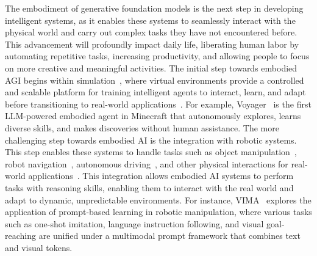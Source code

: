 The embodiment of generative foundation models is the next step in developing intelligent systems, as it enables these systems to seamlessly interact with the physical world and carry out complex tasks they have not encountered before. This advancement will profoundly impact daily life, liberating human labor by automating repetitive tasks, increasing productivity, and allowing people to focus on more creative and meaningful activities. The initial step towards embodied AGI begins within simulation~\cite{li2022behavior, robothor, puig2023habitat3, Matterport3D}, where virtual environments provide a controlled and scalable platform for training intelligent agents to interact, learn, and adapt before transitioning to real-world applications~\cite{liu2024aligningcyberspacephysical}. For example, Voyager~\cite{wang2024voyager} is the first LLM-powered embodied agent in Minecraft that autonomously explores, learns diverse skills, and makes discoveries without human assistance. The more challenging step towards embodied AI is the integration with robotic systems. This step enables these systems to handle tasks such as object manipulation~\cite{jiang2023vima, zitkovich2023rt, fangandliu2024moka, palme}, robot navigation~\cite{elnoor2024robotnav, guan2024loczson, shah2023vint, arul2024vlpgnav}, autonomous driving~\cite{10531702}, and other physical interactions for real-world applications~\cite{Guan2021TNSTT, 10.1007/s10514-023-10113-9}. This integration allows embodied AI systems to perform tasks with reasoning skills, enabling them to interact with the real world and adapt to dynamic, unpredictable environments.
For instance, VIMA~\cite{jiang2023vima} explores the application of prompt-based learning in robotic manipulation, where various tasks such as one-shot imitation, language instruction following, and visual goal-reaching are unified under a multimodal prompt framework that combines text and visual tokens. 

